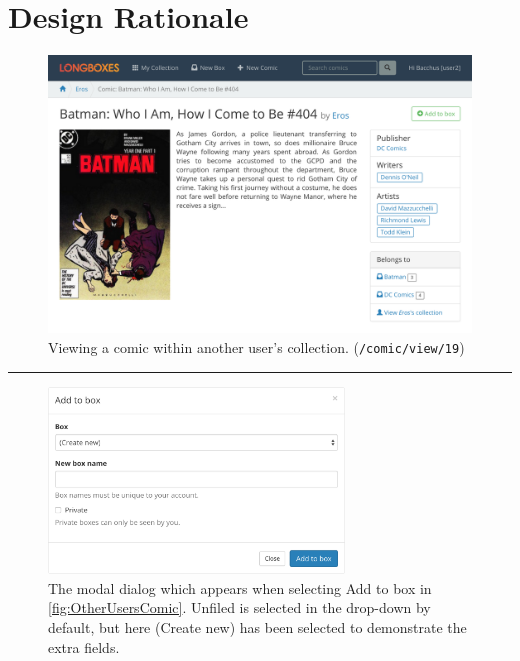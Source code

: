 \documentclass[fontsize=12pt,a4paper]{scrreprt}
\begin{document}
\chapter{Design Rationale}

\begin{figure}[h!]
  \centering
  \includegraphics[width=\textwidth]{other_users_comic.png}
  \caption{
    Viewing a comic within another user's collection.
    (\texttt{/comic/view/19})
  }
  \label{fig:OtherUsersComic}
\end{figure}

\rule{\textwidth}{0.4pt}

\begin{figure}[h!]
  \centering
  \includegraphics[width=0.7\textwidth]{add_to_box_modal.png}
  \caption{
    The modal dialog which appears when selecting \textsf{Add to box} in \autoref{fig:OtherUsersComic}.
    \textsf{Unfiled} is selected in the drop-down by default, but here \textsf{(Create new)} has been selected to demonstrate the extra fields.
  }
  \label{fig:AddToBoxModal}
\end{figure}
\end{document}
